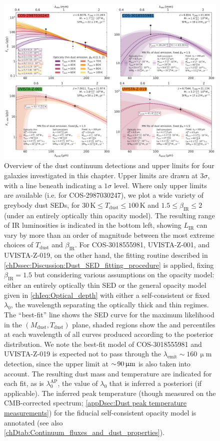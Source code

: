 \begin{figure}
    \centering
    \includegraphics[width=\linewidth]{"Plots/ChapterD/FIR_SED_constraints_COS-2987030247_COS-3018555981_UVISTA-Z-001_UVISTA-Z-019_beta_1.5"}
    \caption[Overview of the dust continuum detections and upper limits.]{Overview of the dust continuum detections and upper limits for four galaxies investigated in this chapter. Upper limits are drawn at $3 \sigma$, with a line beneath indicating a $1 \sigma$ level. Where only upper limits are available (i.e. for COS-2987030247), we plot a wide variety of greybody dust SEDs, for $30 \, \mathrm{K} \leq T_\text{dust} \leq 100 \, \mathrm{K}$ and $1.5 \leq \beta_\text{IR} \leq 2$ (under an entirely optically thin opacity model). The resulting range of IR luminosities is indicated in the bottom left, showing $L_\text{IR}$ can vary by more than an order of magnitude between the most extreme choices of $T_\text{dust}$ and $\beta_\text{IR}$. For COS-3018555981, UVISTA-Z-001, and UVISTA-Z-019, on the other hand, the  fitting routine described in \cref{chDssec:Discussion:Dust_SED_fitting_procedure} is applied, fixing $\beta_\text{IR} = 1.5$ but considering various assumptions on the opacity model: either an entirely optically thin SED or the general opacity model given in \cref{chIeq:Optical_depth} with either a self-consistent or fixed $\lambda_0$, the wavelength separating the optically thick and thin regimes. The ``best-fit'' line shows the SED curve for the maximum likelihood in the $(M_\text{dust}, T_\text{dust})$ plane, shaded regions show the  and  percentiles at each wavelength of all curves produced according to the posterior distribution. We note the best-fit model of COS-3018555981 and UVISTA-Z-019 is expected not to pass through the $\lambda_\text{emit} \sim 160 \, \mathrm{\upmu m}$ detection, since the upper limit at $\sim \! 90 \, \mathrm{\upmu m}$ is also taken into account. The resulting dust mass and temperature are indicated for each fit, as is $\lambda_0^\text{AP}$, the value of $\lambda_0$ that is inferred a posteriori (if applicable). The inferred peak temperature (though measured on the CMB-corrected spectrum; \cref{appDsec:Dust peak temperature measurements}) for the fiducial self-consistent opacity model is annotated (see also \cref{chDtab:Continuum_fluxes_and_dust_properties}).
}
\end{figure}
